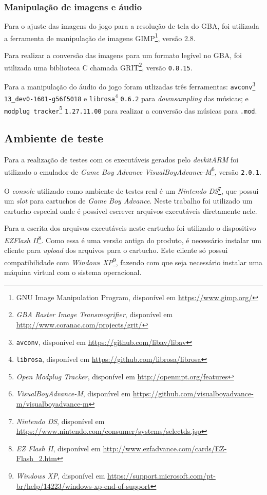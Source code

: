     \subsubsection{Manipulação de imagens e áudio}

      Para o ajuste das imagens do jogo para a resolução de tela do GBA, foi utilizada a ferramenta de manipulação de imagens GIMP\footnote{GNU Image Manipulation Program, disponível em \url{https://www.gimp.org/}}, versão 2.8.

      Para realizar a conversão das imagens para um formato legível no GBA, foi utilizada uma biblioteca C chamada GRIT\footnote{\textit{GBA Raster Image Transmogrifier}, disponível em \url{http://www.coranac.com/projects/grit/}}, versão \texttt{0.8.15}.

      Para a manipulação do áudio do jogo foram utlizadas três ferramentas: \texttt{avconv}\footnote{\texttt{avconv}, disponível em \url{https://github.com/libav/libav}} \texttt{13\_dev0-1601-g56f5018} e \texttt{librosa}\footnote{\texttt{librosa}, disponível em \url{https://github.com/librosa/librosa}} \texttt{0.6.2} para \textit{downsampling} das músicas; e \texttt{modplug tracker}\footnote{\textit{Open Modplug Tracker}, disponível em \url{http://openmpt.org/features}} \texttt{1.27.11.00} para realizar a conversão das músicas para \texttt{.mod}.

  \subsection{Ambiente de teste}

      Para a realização de testes com os executáveis gerados pelo \textit{devkitARM} foi utilizado o emulador de \textit{Game Boy Advance} \textit{VisualBoyAdvance-M}\footnote{\textit{VisualBoyAdvance-M}, disponível em \url{https://github.com/visualboyadvance-m/visualboyadvance-m}}, versão \texttt{2.0.1}.

      O \textit {console} utilizado como ambiente de testes real é um \textit{Nintendo DS}\footnote{\textit{Nintendo DS}, disponível em \url{https://www.nintendo.com/consumer/systems/selectds.jsp}}, que possui um \textit{slot} para cartuchos de \textit{Game Boy Advance}. Neste trabalho foi utilizado um cartucho especial onde é possível escrever arquivos executáveis diretamente nele.

      Para a escrita dos arquivos executáveis neste cartucho foi utilizado o dispositivo \textit{EZFlash II}\footnote{\textit{EZ Flash II}, disponível em \url{http://www.ezfadvance.com/cards/EZ-Flash_2.htm}}. Como essa é uma versão antiga do produto, é necessário instalar um cliente para \textit{upload} dos arquivos para o cartucho. Este cliente só possui compatibilidade com \textit{Windows XP}\footnote{\textit{Windows XP}, disponível em \url{https://support.microsoft.com/pt-br/help/14223/windows-xp-end-of-support}}, fazendo com que seja necessário instalar uma máquina virtual com o sistema operacional.

